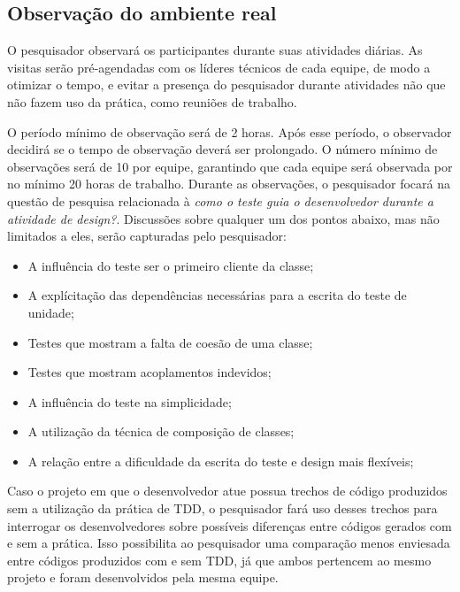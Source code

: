 \subsection{Observação do ambiente real}
\label{sec:planejamento-observacao}

O pesquisador observará os participantes durante suas atividades diárias. As
visitas serão pré-agendadas com os líderes técnicos de cada equipe, de modo a
otimizar o tempo, e evitar a presença do pesquisador durante atividades
não que não fazem uso da prática, como reuniões de trabalho.

O período mínimo de observação será de 2 horas. Após esse período, o observador
decidirá se o tempo de observação deverá ser prolongado. O número mínimo de
observações será de 10 por equipe, garantindo que cada equipe será observada por
no mínimo 20 horas de trabalho. Durante as observações, o pesquisador focará na
questão de pesquisa relacionada à \textit{como o teste guia o desenvolvedor
durante a atividade de design?}. Discussões sobre qualquer um dos pontos abaixo, 
mas não limitados a eles, serão capturadas pelo pesquisador:

\begin{itemize}
  
  \item A influência do teste ser o primeiro cliente da classe;

  \item A explícitação das dependências necessárias para a escrita do teste de
  unidade;

  \item Testes que mostram a falta de coesão de uma classe;

  \item Testes que mostram acoplamentos indevidos;

  \item A influência do teste na simplicidade;

  \item A utilização da técnica de composição de classes;
  
  \item A relação entre a dificuldade da escrita do teste e design mais
  flexíveis;

\end{itemize}

Caso o projeto em que o desenvolvedor atue possua trechos de código produzidos
sem a utilização da prática de TDD, o pesquisador fará uso desses trechos
para interrogar os desenvolvedores sobre possíveis diferenças entre códigos
gerados com e sem a prática. Isso possibilita ao pesquisador uma comparação
menos enviesada entre códigos produzidos com e sem TDD, já que ambos pertencem
ao mesmo projeto e foram desenvolvidos pela mesma equipe.

